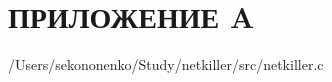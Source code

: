 \chapter*{ПРИЛОЖЕНИЕ A}

\begin{lstinputlisting}[
	caption={Исходный код программы},
	label={lst:source},
	style={c},
	]{/Users/sekononenko/Study/netkiller/src/netkiller.c}
\end{lstinputlisting}

\pagebreak